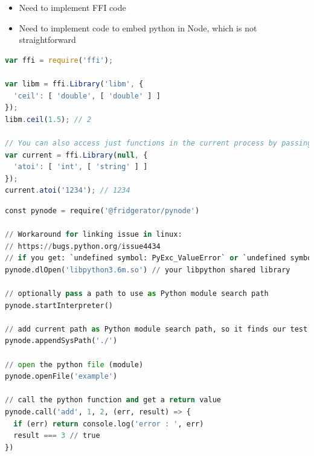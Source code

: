\begin{itemize}
  \item Need to implement FFI code
  \item Need to implement code to embed python in Node, which is not straightforward
\end{itemize}

\begin{minipage}{\linewidth}

  \begin{lstlisting}[language=JavaScript, label={lst:node_ffi}, caption=Example of using \url{node-ffi} to call a C library \autocite{node-ffi}., breaklines=true]
var ffi = require('ffi');

var libm = ffi.Library('libm', {
  'ceil': [ 'double', [ 'double' ] ]
});
libm.ceil(1.5); // 2

// You can also access just functions in the current process by passing a null
var current = ffi.Library(null, {
  'atoi': [ 'int', [ 'string' ] ]
});
current.atoi('1234'); // 1234
\end{lstlisting}

\end{minipage}

\begin{minipage}{\linewidth}

  \begin{lstlisting}[language=Python, label={lst:pynode}, caption=Example of using \url{pynode} to embed python in JavaScript \autocite{pynode}., breaklines=true]
const pynode = require('@fridgerator/pynode')

// Workaround for linking issue in linux:
// https://bugs.python.org/issue4434
// if you get: `undefined symbol: PyExc_ValueError` or `undefined symbol: PyExc_SystemError`
pynode.dlOpen('libpython3.6m.so') // your libpython shared library

// optionally pass a path to use as Python module search path
pynode.startInterpreter()

// add current path as Python module search path, so it finds our test.py
pynode.appendSysPath('./')

// open the python file (module)
pynode.openFile('example')

// call the python function and get a return value
pynode.call('add', 1, 2, (err, result) => {
  if (err) return console.log('error : ', err)
  result === 3 // true
})
\end{lstlisting}

\end{minipage}

